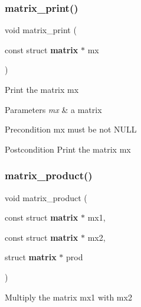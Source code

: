 \subsubsection{matrix\+\_\+print()}
{\footnotesize\ttfamily void matrix\+\_\+print (\begin{DoxyParamCaption}\item[{const struct \textbf{ matrix} $\ast$}]{mx }\end{DoxyParamCaption})}

Print the matrix {\ttfamily mx}


\begin{DoxyParams}{Parameters}
{\em mx} & a matrix\\
\hline
\end{DoxyParams}
\begin{DoxyPrecond}{Precondition}
{\ttfamily mx} must be not N\+U\+LL
\end{DoxyPrecond}
\begin{DoxyPostcond}{Postcondition}
Print the matrix {\ttfamily mx} 
\end{DoxyPostcond}
\mbox{\label{matrix_8c_a48e828fb00afc50e3616adefe87643bf}} 
\subsubsection{matrix\+\_\+product()}
{\footnotesize\ttfamily void matrix\+\_\+product (\begin{DoxyParamCaption}\item[{const struct \textbf{ matrix} $\ast$}]{mx1,  }\item[{const struct \textbf{ matrix} $\ast$}]{mx2,  }\item[{struct \textbf{ matrix} $\ast$}]{prod }\end{DoxyParamCaption})}

Multiply the matrix {\ttfamily mx1} with {\ttfamily mx2}



